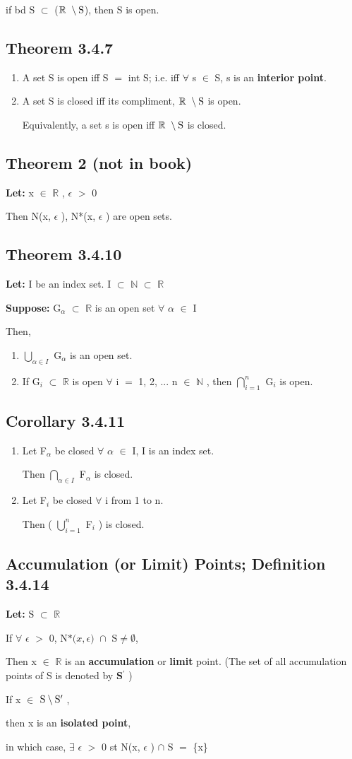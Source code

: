 \documentclass{article}
\newcommand{\mt}[1]{\ensuremath{#1}}
\newcommand\ssc[2][\DefaultOpt]{%
  \def\DefaultOpt{#2}%
  \subsection[#1]{#2}%
}
\newcommand{\balist}{\begin{enumerate}[label=\alph*.]}
\newcommand{\elist}{\end{enumerate}}
\newcommand{\lt}[1]{\textbf{Let: } #1}
\newcommand{\supp}[1]{\textbf{Suppose: } #1}
\newcommand{\br}{\mt{\mathbb{R}} }       %
\newcommand{\bn}{\mt{\mathbb{N}} }       %
\newcommand{\ep}{\mt{\epsilon} }         %
\newcommand{\fa}{\mt{\forall} }          %
\newcommand{\afa}{\mt{\alpha} }
\newcommand{\mem}{\mt{\in} }
\newcommand{\exs}{\mt{\exists} }
\newcommand{\sbs}{\mt{\subset} }         %
\newcommand{\eql}{\mt{=} }
\newcommand{\pr}{\mt{^\prime} } 		   %
\newcommand{\uw}[2]{#1\mt{_{#2}}}
\newcommand{\bnt}[2]{\mt{\textrm{#1}\setminus{\textrm{#2}}}}
\newcommand{\urng}[2]{\mt{\bigcup_{#1}^{#2}}}
\newcommand{\nrng}[2]{\mt{\bigcap_{#1}^{#2}}}
\newcommand{\dnbho}[3]{\textrm{N*(}#1, #2\textrm{) }\cap \textrm{ #3} \neq \emptyset}
\begin{document}
{{{	if bd S \sbs (\bnt{\br}{S}), then S is open.

}


\ssc{Theorem 3.4.7}{

\balist
\item A set S is open iff S \eql int S; i.e. iff \fa s \mem S, s is an \textbf{interior point}.
\item A set S is closed iff its compliment, \bnt{\br}{S} is open.

	Equivalently, a set s is open iff \bnt{\br}{S} is closed.
	
\elist
}

\ssc{Theorem 2 (not in book)}{

\lt{x \mem \br, \ep $>$ 0}

Then N(x, \ep), N*(x, \ep) are open sets.
}

\ssc{Theorem 3.4.10}{

\lt{I be an index set. I \sbs \bn \sbs \br}

\supp{\uw{G}{\afa} \sbs \br is an open set \fa \afa \mem I}

Then, 

\balist
\item \urng{\afa \mem I}{} \uw{G}{\afa} is an open set.
\item If \uw{G}{i} \sbs \br is open \fa i \eql 1, 2, ... n \mem \bn, then \nrng{i = 1}{n} \uw{G}{i} is open.
\elist

}

\ssc{Corollary 3.4.11}{

\balist
\item Let \uw{F}{\afa} be closed \fa \afa \mem I, I is an index set.

	Then \nrng{\afa \mem I}{} \uw{F}{\afa} is closed.
\item Let \uw{F}{i} be closed \fa i from 1 to n.
	
	Then ( \urng{i = 1}{n} \uw{F}{i} ) is closed.
\elist
}

\ssc{Accumulation (or Limit) Points; Definition 3.4.14}{

\lt{S \sbs \br}

If \fa \ep $>$ 0, $\dnbho{x}{\ep}{S}$,

Then x \mem \br is an \textbf{accumulation} or \textbf{limit} point. (The set of all accumulation points of S is denoted by \textbf{S\pr})

If x \mem \bnt{S}{S\pr},

then x is an \textbf{isolated point},

in which case, \exs \ep $>$ 0 st N(x, \ep) $\cap$ S \eql \{x\}

}}}
\end{document}
